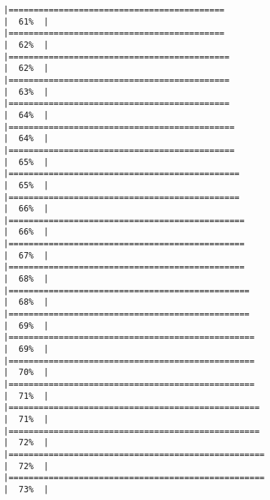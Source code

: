 \documentclass[10pt,letterpaper]{article}
\begin{document}
\begin{verbatim}
|===========================================                           |  61%  |                                                                              |===========================================                           |  62%  |                                                                              |============================================                          |  62%  |                                                                              |============================================                          |  63%  |                                                                              |============================================                          |  64%  |                                                                              |=============================================                         |  64%  |                                                                              |=============================================                         |  65%  |                                                                              |==============================================                        |  65%  |                                                                              |==============================================                        |  66%  |                                                                              |===============================================                       |  66%  |                                                                              |===============================================                       |  67%  |                                                                              |===============================================                       |  68%  |                                                                              |================================================                      |  68%  |                                                                              |================================================                      |  69%  |                                                                              |=================================================                     |  69%  |                                                                              |=================================================                     |  70%  |                                                                              |=================================================                     |  71%  |                                                                              |==================================================                    |  71%  |                                                                              |==================================================                    |  72%  |                                                                              |===================================================                   |  72%  |                                                                              |===================================================                   |  73%  |                                                                              
\end{verbatim}
\end{document}
